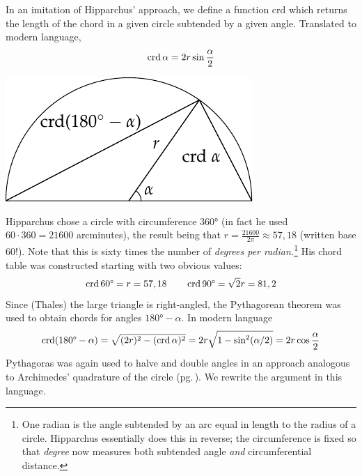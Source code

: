 \begin{minipage}[t]{0.63\linewidth}\vspace{0pt}
In an imitation of Hipparchus' approach, we define a function crd which returns the length of the chord in a given circle subtended by a given angle. Translated to modern language,
\[\crd\alpha=2r\sin\frac\alpha 2\]
\end{minipage}\hfill\begin{minipage}[t]{0.36\linewidth}\vspace{-10pt}
\flushright\includegraphics[scale=0.95]{trig-chord}
\end{minipage}\medbreak
Hipparchus chose a circle with circumference \ang{360} (in fact he used $60\cdot 360=21600$ arcminutes), the result being that $r=\frac{21600}{2\pi}\approx 57,18$ (written base 60!). Note that this is sixty times the number of \emph{degrees per radian.}\footnote{One radian is the angle subtended by an arc equal in length to the radius of a circle. Hipparchus essentially does this in reverse; the circumference is fixed so that \emph{degree} now measures both subtended angle \emph{and} circumferential distance.} His chord table was constructed starting with two obvious values:
\[\crd \ang{60}=r=57,18\qquad \crd \ang{90}=\sqrt 2r=81,2\]
Since (Thales) the large triangle is right-angled, the Pythagorean theorem was used to obtain chords for angles $\ang{180}-\alpha$. In modern language
\[\crd(\ang{180}-\alpha)=\sqrt{(2r)^2-(\crd\alpha)^2}=2r\sqrt{1-\sin^2(\alpha/2)}=2r\cos\frac\alpha 2\]
Pythagoras was again used to halve and double angles in an approach analogous to Archimedes' quadrature of the circle (pg.\,\pageref{pg:archquadcircle}). We rewrite the argument in this language.\par
